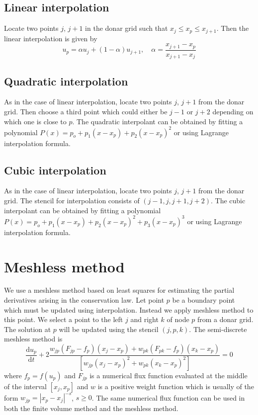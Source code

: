 \documentclass[11pt]{amsart}
\newcommand{\ud}{\textrm{d}}
\newcommand{\dd}[2]{\frac{ \ud #1 }{ \ud #2 }}
\begin{document}
\subsection{Linear interpolation}
Locate two points $j$, $j+1$ in the donar grid such that $x_j \le x_p \le x_{j+1}$. Then the linear interpolation is given by
\begin{equation}
u_p = \alpha u_j + (1-\alpha) u_{j+1}, \quad \alpha = \frac{x_{j+1} - x_p}{x_{j+1} - x_j}
\end{equation}

\subsection{Quadratic interpolation}
As in the case of linear interpolation, locate two points $j$, $j+1$ from the donar grid. Then choose a third point which could either be $j-1$ or $j+2$ depending on which one is close to $p$. The quadratic interpolant can be obtained by fitting a polynomial $P(x) = p_o + p_1(x-x_p) + p_2(x-x_p)^2$ or using Lagrange interpolation formula.

\subsection{Cubic interpolation}
As in the case of linear interpolation, locate two points $j$, $j+1$ from the donar grid. The stencil for interpolation consists of $(j-1, j, j+1, j+2)$. The cubic interpolant can be obtained by fitting a polynomial $P(x) = p_o + p_1(x-x_p) + p_2(x-x_p)^2 + p_3(x-x_p)^3$ or using Lagrange interpolation formula.
\section{Meshless method}

We use a meshless method based on least squares for estimating the partial derivatives arising in the conservation law. Let point $p$ be a boundary point which must be updated using interpolation. Instead we apply meshless method to this point. We select a point to the left  $j$ and right $k$ of node $p$ from a donar grid. The solution at $p$ will be updated using the stencil $(j,p,k)$. The semi-discrete meshless method is
\begin{equation}
\dd{u_p}{t} + 2 \frac{ w_{jp} (F_{jp} - f_p)(x_j - x_p) + w_{pk} (F_{pk} - f_p)(x_k - x_p) }{[ w_{jp} (x_j - x_p)^2 + w_{pk} (x_k - x_p)^2] } = 0
\label{eq:semid}
\end{equation}
where $f_p = f(u_p)$ and $F_{jp}$ is a numerical flux function evaluated at the middle of the interval $[x_j, x_p]$ and $w$ is a positive weight function which is usually of the form $w_{jp} = |x_p - x_j|^{-s}$, $s\ge 0$. The same numerical flux function can be used in both the finite volume method and the meshless method.
\end{document}
